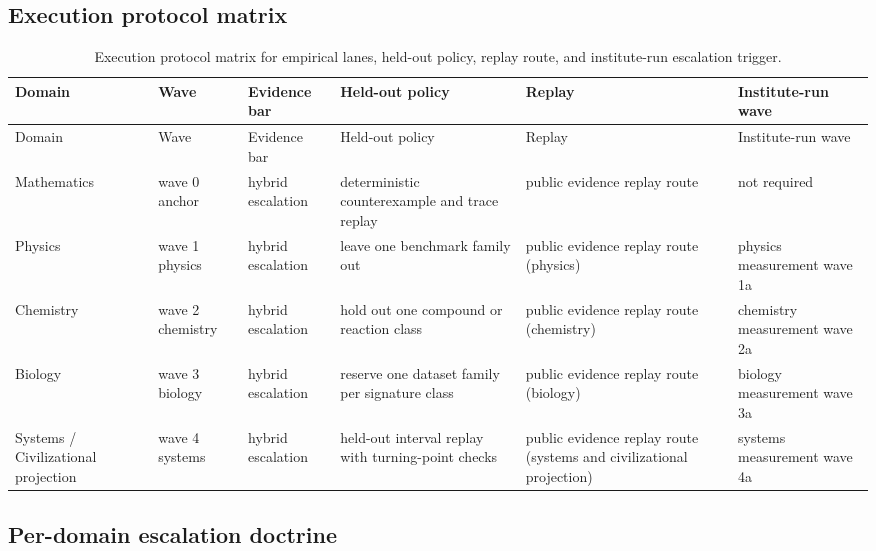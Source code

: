 \subsection{Execution protocol matrix}
\begin{octablescope}
\begin{longtable}{@{}L{0.13\textwidth}L{0.09\textwidth}L{0.10\textwidth}L{0.18\textwidth}L{0.13\textwidth}L{0.14\textwidth}@{}}
\caption{Execution protocol matrix for empirical lanes, held-out policy, replay route, and institute-run escalation trigger.}\label{tab:r013-execution-protocol-matrix}\\
\toprule
Domain & Wave & Evidence bar & Held-out policy & Replay & Institute-run wave \\
\midrule
\endfirsthead
\toprule
Domain & Wave & Evidence bar & Held-out policy & Replay & Institute-run wave \\
\midrule
\endhead
Mathematics & wave 0 anchor & hybrid escalation & deterministic counterexample and trace replay & public evidence replay route & not required \\
Physics & wave 1 physics & hybrid escalation & leave one benchmark family out & public evidence replay route (physics) & physics measurement wave 1a \\
Chemistry & wave 2 chemistry & hybrid escalation & hold out one compound or reaction class & public evidence replay route (chemistry) & chemistry measurement wave 2a \\
Biology & wave 3 biology & hybrid escalation & reserve one dataset family per signature class & public evidence replay route (biology) & biology measurement wave 3a \\
Systems / Civilizational projection & wave 4 systems & hybrid escalation & held-out interval replay with turning-point checks & public evidence replay route (systems and civilizational projection) & systems measurement wave 4a \\
\bottomrule
\end{longtable}
\end{octablescope}

\subsection{Per-domain escalation doctrine}
